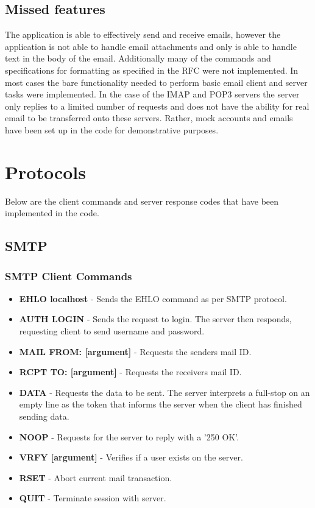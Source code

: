 \documentclass[11pt]{article}
\begin{document}
\begin{multicols}{2}
\subsection{Missed features}
The application is able to effectively send and receive emails, however the application is not able to handle email attachments and only is able to handle text in the body of the email. Additionally many of the commands and specifications for formatting as specified in the RFC were not implemented. In most cases the bare functionality needed to perform basic email client and server tasks were implemented. In the case of the IMAP and POP3 servers the server only replies to a limited number of requests and does not have the ability for real email to be transferred onto these servers. Rather, mock accounts and emails have been set up in the code for demonstrative purposes.
\section{Protocols}
Below are the client commands and server response codes that have been implemented in the code.
\subsection{SMTP}
\subsubsection{SMTP Client Commands}
\begin{itemize}
  \item \textbf{EHLO localhost} - Sends the EHLO command as per SMTP protocol.
  \item \textbf{AUTH LOGIN} - Sends the request to login. The server then responds, requesting client to send username and password.
  \item \textbf{MAIL FROM: [argument]} - Requests the senders mail ID.
  \item \textbf{RCPT TO: [argument]} - Requests the receivers mail ID.
  \item \textbf{DATA} - Requests the data to be sent. The server interprets a full-stop on an empty line as the token that informs the server when the client has finished sending data.
  \item \textbf{NOOP} - Requests for the server to reply with a '250 OK'.
  \item \textbf{VRFY [argument]} - Verifies if a user exists on the server.
  \item \textbf{RSET} - Abort current mail transaction.
  \item \textbf{QUIT} - Terminate session with server.
\end{itemize}

\end{multicols}
\end{document}
